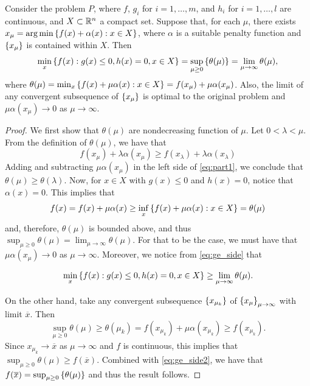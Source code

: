 \begin{theorem}\label{thm:conv_pen_method}
Consider the problem $P$, where $f$, $g_i$ for $i=1,\dots,m$, and $h_i$ for $i=1,\dots,l$ are continuous, and $X \subset \mathbb{R}^n$ a compact set. Suppose that, for each $\mu$, there exists $x_\mu = \arg\min \left\{ f(x) + \alpha(x) : x \in X \right \}$, where $\alpha$ is a suitable penalty function and $\left\{ x_\mu \right \}$ is contained within $X$. Then
$$ \min_x\left\{ f(x) : g(x) \leq 0, h(x) = 0, x \in X \right \} = \sup_{\mu \geq 0}\left\{ \theta(\mu) \right \} = \lim_{\mu \rightarrow\infty}\theta(\mu),
$$
where $\theta(\mu) = \min_x \left\{ f(x) + \mu\alpha(x) : x \in X \right \} = f(x_\mu) + \mu\alpha(x_\mu)$. Also, the limit of any convergent subsequence of $\left\{ x_\mu \right \}$ is optimal to the original problem and $\mu\alpha(x_\mu) \rightarrow 0$ as $\mu \rightarrow \infty$.
\end{theorem}
%
\begin{proof}
	We first show that $\theta(\mu)$ are nondecreasing function of $\mu$. Let $0 < \lambda < \mu$. From the definition of $\theta(\mu)$, we have that 
	\begin{equation} 
		f(x_\mu) + \lambda\alpha(x_\mu) \geq f(x_\lambda) + \lambda \alpha(x_\lambda) \label{eq:part1}
	\end{equation}
	Adding and subtracting $\mu\alpha(x_\mu)$ in the left side of \eqref{eq:part1}, we conclude that $\theta(\mu) \geq \theta(\lambda)$. Now, for $x \in X$ with $g(x) \leq 0$ and $h(x) = 0$, notice that $\alpha(x) = 0$. This implies that
	\begin{equation} \label{eq:ge_side}
		 f(x) = f(x) + \mu\alpha(x) \geq \inf_x\left\{ f(x) + \mu\alpha(x) : x \in X \right \} = \theta(\mu)
	\end{equation}
	and, therefore, $\theta(\mu)$ is bounded above, and thus $\sup_{\mu \geq 0}\theta(\mu) = \lim_{\mu \rightarrow\infty}\theta(\mu)$. For that to be the case, we must have that $\mu\alpha(x_\mu) \rightarrow 0$ as $\mu \rightarrow \infty$. Moreover, we notice from \eqref{eq:ge_side} that
	
	\begin{equation} \label{eq:ge_side2}
		 \min_x\left\{ f(x) : g(x) \leq 0, h(x) = 0, x \in X \right \} \geq \lim_{\mu \rightarrow\infty}\theta(\mu).
	\end{equation}
	
	On the other hand, take any convergent subsequence $\left\{ x_{\mu_k} \right \}$ of $\left\{ x_\mu \right \}_{\mu \rightarrow \infty}$ with limit $\overline{x}$. Then
	$$
	\sup_{\mu \geq 0} \theta(\mu) \geq \theta(\mu_k) = f(x_{\mu_k}) + \mu\alpha(x_{\mu_k}) \geq f(x_{\mu_k}).
	$$
	Since $x_{\mu_k} \rightarrow \overline{x}$ as $\mu \rightarrow \infty$ and $f$ is continuous, this implies that $\sup_{\mu \geq 0} \theta(\mu) \geq f(\overline{x})$. Combined with \eqref{eq:ge_side2}, we have that $f(\overline{x}) = \sup_{\mu \geq 0}\left\{ \theta(\mu) \right \}$ and thus the result follows.
\end{proof}

